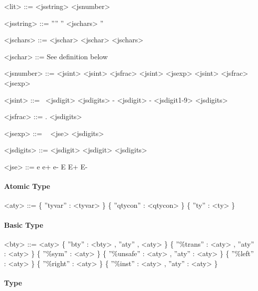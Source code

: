 \begin{scriptsize}
\begin{grammar}


<lit>		  ::= 	<jsstring>		 
		  \alt 	<jsnumber>


<jsstring>	  ::= 	 ''''														 
		  \alt 	'' <jschars> ''		
											 
<jschars>	  ::= 	<jschar>
		  \alt 	<jschar> <jschars>
												 
<jschar>	  ::= 	 See definition below

<jsnumber>	  ::=  	<jsint>
		  \alt 	<jsint> <jsfrac>
		  \alt 	<jsint> <jsexp>
		  \alt 	<jsint> <jsfrac> <jsexp>
											 
<jsint>		  ::= 	<jsdigit>
		  \alt  <jsdigit1-9> <jsdigits> 
		  \alt  - <jsdigit>
		  \alt  - <jsdigit1-9> <jsdigits>

<jsfrac> 	  ::=  	. <jsdigits>

<jsexp>		  ::=  	<jse> <jsdigits>

<jsdigits>	  ::=  	<jsdigit> 
		  \alt  <jsdigit> <jsdigits>

<jse>		  ::=  	e
		  \alt  e+		 
		  \alt  e- 		 
		  \alt  E		 
		  \alt  E+		 
		  \alt  E-

\end{grammar}

\paragraph{Atomic Type}

\begin{grammar}
<aty>		  ::= 	 \{ ''tyvar'' : <tyvar> \}
		  \alt 	 \{ ''qtycon'' : <qtycon> \}
		  \alt   \{ ''ty'' : <ty> \}

\end{grammar}

\paragraph{Basic Type}

\begin{grammar}
<bty>		  ::= 	 <aty>
		  \alt 	 \{ ''bty'' : <bty> , ''aty'' , <aty> \}
		  \alt 	 \{ ''\%trans'' : <aty> , ''aty'' : <aty> \}
		  \alt 	 \{ ''\%sym'' : <aty> \}
		  \alt 	 \{ ''\%unsafe'' : <aty> , ''aty'' : <aty> \}	
		  \alt 	 \{ ''\%left'' : <aty> \}
		  \alt 	 \{ ''\%right'' : <aty> \}	
		  \alt 	 \{ ''\%inst'' : <aty> , ''aty'' : <aty> \}


\end{grammar}

\paragraph{Type}


\end{scriptsize}
